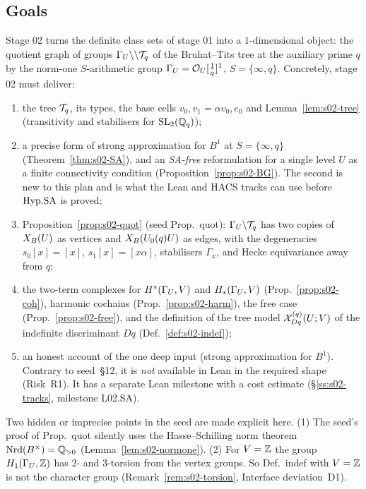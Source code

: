 \subsection{Goals}
Stage 02 turns the definite class sets of stage 01 into a $1$-dimensional object: the quotient graph of
groups $\Gamma_U\backslash\backslash\mathcal{T}_q$ of the Bruhat--Tits tree at the auxiliary prime $q$ by the norm-one $S$-arithmetic
group $\Gamma_U=\mathcal{O}_U[\frac1q]^1$, $S=\{\infty,q\}$. Concretely, stage 02 must deliver:
\begin{enumerate}[label=(G\arabic*)]
\item the tree $\mathcal{T}_q$, its types, the base cells $v_0,v_1=\alpha v_0,e_0$ and Lemma~\ref{lem:s02-tree}
  (transitivity and stabilisers for $\mathrm{SL}_2(\mathbb{Q}_q)$);
\item a precise form of strong approximation for $B^1$ at $S=\{\infty,q\}$ (Theorem~\ref{thm:s02-SA}),
  and an \emph{SA-free} reformulation for a single level $U$ as a finite connectivity condition
  (Proposition~\ref{prop:s02-BG}). The second is new to this plan and is what the Lean and HACS tracks can
  use before $\mathrm{Hyp.SA}$ is proved;
\item Proposition~\ref{prop:s02-quot} (seed Prop.~quot): $\Gamma_U\backslash\mathcal{T}_q$ has two copies of $X_B(U)$ as
  vertices and $X_B(U_0(q)U)$ as edges, with the degeneracies $s_0[x]=[x]$, $s_1[x]=[x\alpha]$, stabilisers
  $\Gamma_x$, and Hecke equivariance away from $q$;
\item the two-term complexes for $H^*(\Gamma_U,V)$ and $H_*(\Gamma_U,V)$ (Prop.~\ref{prop:s02-coh}), harmonic
  cochains (Prop.~\ref{prop:s02-harm}), the free case (Prop.~\ref{prop:s02-free}), and the definition of the
  tree model $\mathcal{X}^{(q)}_{Dq}(U;V)$ of the indefinite discriminant $Dq$ (Def.~\ref{def:s02-indef});
\item an honest account of the one deep input (strong approximation for $B^1$). Contrary to seed~\S12,
  it is \emph{not} available in Lean in the required shape (Risk~R1). It has a separate Lean milestone
  with a cost estimate (\S\ref{ss:s02-tracks}, milestone L02.SA).
\end{enumerate}
Two hidden or imprecise points in the seed are made explicit here. (1) The seed's proof of Prop.~quot
silently uses the Hasse--Schilling norm theorem $\mathrm{Nrd}(B^\times)=\mathbb{Q}_{>0}$ (Lemma~\ref{lem:s02-normone}).
(2) For $V=\mathbb{Z}$ the group $H_1(\Gamma_U,\mathbb{Z})$ has $2$- and $3$-torsion from the vertex groups. So
Def.~indef with $V=\mathbb{Z}$ is not the character group (Remark~\ref{rem:s02-torsion}, Interface deviation~D1).

